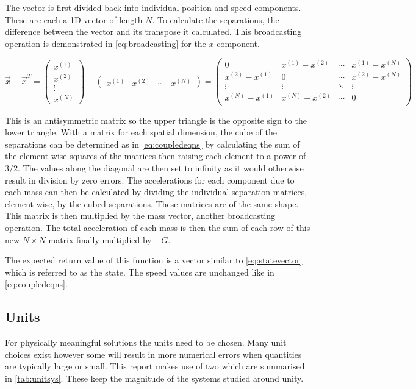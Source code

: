 \documentclass{physics_article_B}
\begin{document}
The vector is first divided back into individual position and speed components. These are each a 1D vector of length $N$. To calculate the separations, the difference between the vector and its transpose it calculated. This broadcasting operation is demonstrated in \cref{eq:broadcasting} for the $x$-component.

\begin{equation}
 \vec{x} - \vec{x}^T =
 \begin{pmatrix}
 x^{(1)} \\ x^{(2)} \\ \vdots \\ x^{(N)}
 \end{pmatrix}
 -
 \begin{pmatrix}
 x^{(1)} & x^{(2)} & \cdots & x^{(N)}
 \end{pmatrix}
 =
 \begin{pmatrix}
 0 & x^{(1)} - x^{(2)} & \cdots & x^{(1)} - x^{(N)} \\
 x^{(2)} - x^{(1)} & 0 & \cdots & x^{(2)} - x^{(N)} \\
 \vdots & \vdots & \ddots & \vdots \\
 x^{(N)} - x^{(1)} & x^{(N)} - x^{(2)} & \cdots & 0 \\
 \end{pmatrix}
 \label{eq:broadcasting}
\end{equation}

This is an antisymmetric matrix so the upper triangle is the opposite sign to the lower triangle. With a matrix for each spatial dimension, the cube of the separations can be determined as in \cref{eq:coupledeqns} by calculating the sum of the element-wise squares of the matrices then raising each element to a power of $3/2$. The values along the diagonal are then set to infinity as it would otherwise result in division by zero errors. The accelerations for each component due to each mass can then be calculated by dividing the individual separation matrices, element-wise, by the cubed separations. These matrices are of the same shape. This matrix is then multiplied by the mass vector, another broadcasting operation. The total acceleration of each mass is then the sum of each row of this new $N\times N$ matrix finally multiplied by $-G$.

The expected return value of this function is a vector similar to \cref{eq:statevector} which is referred to as the state. The speed values are unchanged like in \cref{eq:coupledeqns}.

\subsection{Units}
For physically meaningful solutions the units need to be chosen. Many unit choices exist however some will result in more numerical errors when quantities are typically large or small. This report makes use of two which are summarised in \cref{tab:unitsys}. These keep the magnitude of the systems studied around unity.
\end{document}
